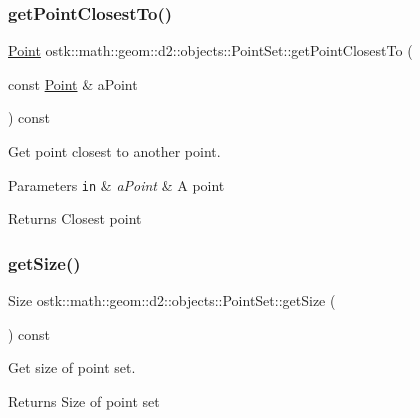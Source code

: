 \subsubsection{\texorpdfstring{get\+Point\+Closest\+To()}{getPointClosestTo()}}
{\footnotesize\ttfamily \hyperlink{classostk_1_1math_1_1geom_1_1d2_1_1objects_1_1_point}{Point} ostk\+::math\+::geom\+::d2\+::objects\+::\+Point\+Set\+::get\+Point\+Closest\+To (\begin{DoxyParamCaption}\item[{const \hyperlink{classostk_1_1math_1_1geom_1_1d2_1_1objects_1_1_point}{Point} \&}]{a\+Point }\end{DoxyParamCaption}) const}



Get point closest to another point. 


\begin{DoxyParams}[1]{Parameters}
\mbox{\tt in}  & {\em a\+Point} & A point \\
\hline
\end{DoxyParams}
\begin{DoxyReturn}{Returns}
Closest point 
\end{DoxyReturn}
\mbox{\label{classostk_1_1math_1_1geom_1_1d2_1_1objects_1_1_point_set_a169dfd11b6bd2e162f1ceb632ee19508}} 
\subsubsection{\texorpdfstring{get\+Size()}{getSize()}}
{\footnotesize\ttfamily Size ostk\+::math\+::geom\+::d2\+::objects\+::\+Point\+Set\+::get\+Size (\begin{DoxyParamCaption}{ }\end{DoxyParamCaption}) const}



Get size of point set. 

\begin{DoxyReturn}{Returns}
Size of point set 
\end{DoxyReturn}
\mbox{\label{classostk_1_1math_1_1geom_1_1d2_1_1objects_1_1_point_set_a6b2dd586eeb7f4fbf659fa9810574315}} 
